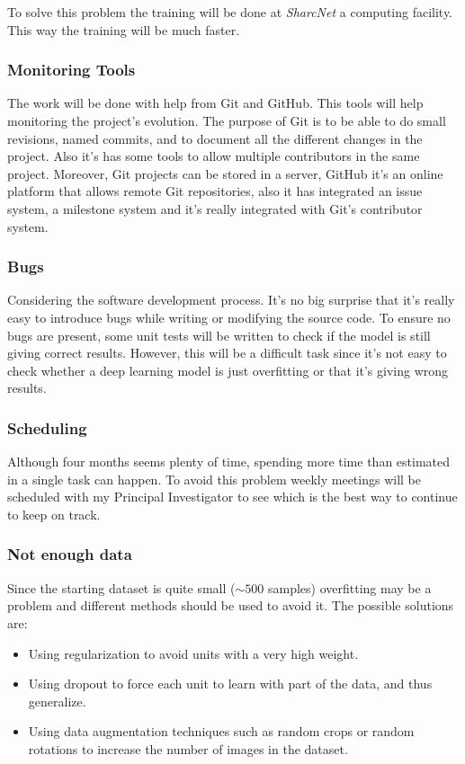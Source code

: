 To solve this problem the training will be done at \emph{SharcNet} a computing facility. 
This way the training will be much faster.

\subsubsection{Monitoring Tools}

The work will be done with help from Git and GitHub. This tools will help monitoring
the project's evolution. The purpose of Git is to be able to do small revisions,
named commits, and to document all the different changes in the project. Also it's has
some tools to allow multiple contributors in the same project. Moreover,
Git projects can be stored in a server, GitHub it's an online platform that allows
remote Git repositories, also it has integrated an issue system, a milestone system
and it's really integrated with Git's contributor system.
~\cites{tool:Git}{tool:GitHub}

\subsubsection{Bugs}

Considering the software development process. It's no big surprise that it's really easy to
introduce bugs while writing or modifying the source code. To ensure no bugs are present,
some unit tests will be written to check if the model is still giving correct results.
However, this will be a difficult task since it's not easy to check whether a deep 
learning model is just overfitting or that it's giving wrong results.

\subsubsection{Scheduling}

Although four months seems plenty of time, spending more time than estimated in a single task
can happen. To avoid this problem weekly meetings will be scheduled with my Principal Investigator
to see which is the best way to continue to keep on track.

\subsubsection{Not enough data}

Since the starting dataset is quite small (\( \sim 500 \) samples) overfitting may be a problem
and different methods should be used to avoid it. The possible solutions are:
\begin{itemize}
  \item Using regularization to avoid units with a very high weight.
  \item Using dropout to force each unit to learn with part of the data, and thus generalize.
  \item Using data augmentation techniques such as random crops or random rotations to increase
  the number of images in the dataset.
\end{itemize}
